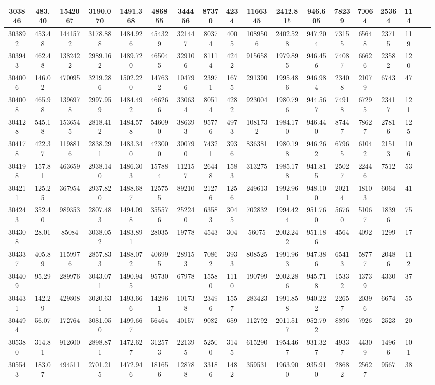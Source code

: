 \documentclass[10pt]{extarticle}
\begin{document}
\begin{longtable}{|c|c|c|c|c|c|c|c|c|c|c|c|c|c|c|c|c|c|}
\hline 
303846&483.40&1542067&3190.070&1491.368&486855&344456&87370&4234&1166345&2412.815&946.605&78239&70064&25364&114 \\ 
\hline 
303892&453.48&1441572&3178.888&1484.926&454329&321447&80374&4005&1089506&2402.528&947.204&73155&65648&23715&119 \\ 
\hline 
303943&462.48&1382422&2989.162&1489.720&465045&329106&81114&4242&915658&1979.895&946.456&74087&66626&23582&120 \\ 
\hline 
304006&146.02&470095&3219.286&1502.220&147632&104796&23971&1675&291390&1995.486&946.984&23408&21079&6743&47 \\ 
\hline 
304008&465.98&1396978&2997.959&1484.492&466266&330634&80514&4282&923004&1980.796&944.567&74918&67295&23417&121 \\ 
\hline 
304128&545.18&1536545&2818.412&1484.578&546090&386393&95776&4973&1081732&1984.170&946.440&87447&78627&27816&125 \\ 
\hline 
304178&422.37&1198816&2838.291&1483.340&423000&300790&74321&3936&836381&1980.198&946.262&67965&61042&21513&106 \\ 
\hline 
304198&157.81&463659&2938.140&1486.303&157884&112157&26448&1583&313275&1985.178&941.815&25027&22446&7512&53 \\ 
\hline 
304211&125.25&367954&2937.820&1488.687&125755&89210&21276&1256&249613&1992.961&948.100&20214&18103&6064&41 \\ 
\hline 
304243&352.40&989353&2807.483&1494.098&355576&252240&63583&3045&702832&1994.424&951.760&56760&51067&18396&75 \\ 
\hline 
304308&28.01&85084&3038.052&1483.891&28035&19778&4543&304&56075&2002.242&951.186&4564&4092&1299&17 \\ 
\hline 
304337&405.89&1159976&2857.833&1488.072&406995&289153&70862&3933&808525&1991.963&947.386&65413&58777&20486&112 \\ 
\hline 
304409&95.29&289976&3043.071&1490.945&95730&67978&15580&1110&190799&2002.286&945.718&15332&13739&4330&37 \\ 
\hline 
304431&142.29&429808&3020.631&1493.666&142961&101738&23496&1557&283423&1991.858&940.222&22657&20396&6674&55 \\ 
\hline 
304494&56.07&172764&3081.050&1499.667&56464&40157&9082&659&112792&2011.517&952.792&8896&7926&2523&20 \\ 
\hline 
305380&314.81&912600&2898.871&1472.627&312573&221395&52500&3145&615290&1954.467&931.327&49337&44309&14966&101 \\ 
\hline 
305543&183.07&494511&2701.215&1472.946&181656&128788&33186&1482&359531&1963.900&935.910&28682&25627&9567&38 \\ 

\end{longtable}
\end{document}

